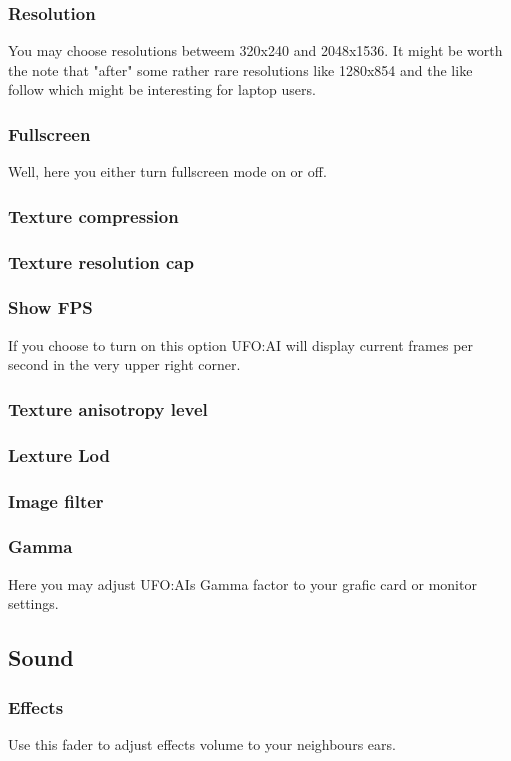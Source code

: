 \subsubsection*{Resolution}
You may choose resolutions betweem 320x240 and 2048x1536. It might be worth the note that "after" some rather rare resolutions like 1280x854 and the like follow which might be interesting for laptop users.
\subsubsection*{Fullscreen}
Well, here you either turn fullscreen mode on or off.
\subsubsection*{Texture compression}
\subsubsection*{Texture resolution cap}
\subsubsection*{Show FPS}
If you choose to turn on this option UFO:AI will display current frames per second in the very upper right corner.
\subsubsection*{Texture anisotropy level}
\subsubsection*{Lexture Lod}
\subsubsection*{Image filter}
\subsubsection*{Gamma}
Here you may adjust UFO:AIs Gamma factor to your grafic card or monitor settings.

\subsection{Sound}
\subsubsection*{Effects}
Use this fader to adjust effects volume to your neighbours ears.
